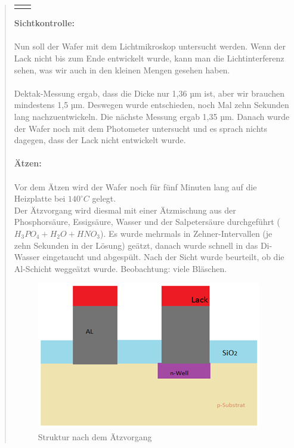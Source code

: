 \begin{quote}
\begin{center}
\begin{tabular}{ll}
\begin{minipage}{0.5\textwidth}
                    \end{minipage}

                \end{tabular}
			\end{center}

    		\vspace{2em}

    		\textbf{Sichtkontrolle:}\\
			\\
			Nun soll der Wafer mit dem Lichtmikroskop untersucht werden. Wenn
			der Lack nicht bis zum Ende entwickelt wurde, kann man die
			Lichtinterferenz sehen, was wir auch in den kleinen Mengen gesehen
			haben.\\
			\\
			Dektak-Messung ergab, dass die Dicke nur 1,36 µm ist, aber wir
			brauchen mindestens 1,5 µm. Deswegen wurde entschieden, noch Mal
			zehn Sekunden lang nachzuentwickeln. Die nächste Messung ergab
			1,35 µm. Danach wurde der Wafer noch mit dem Photometer untersucht
			und es sprach nichts dagegen, dass der Lack nicht entwickelt wurde.\\
			\\
			\textbf{Ätzen:}\\
			\\
			Vor dem Ätzen wird der Wafer noch für fünf Minuten lang auf die
			Heizplatte bei $140^{\circ}C$ gelegt.\\
			Der Ätzvorgang wird diesmal mit einer Ätzmischung aus der
			Phosphorsäure, Essigsäure, Wasser und der Salpetersäure durchgeführt
			($H_{3}PO_{4} +H_{2}O+HNO_{3}$). Es wurde mehrmals in
			Zehner-Intervallen (je zehn Sekunden in der Lösung) geätzt, danach
			wurde schnell in das Di-Wasser eingetaucht und abgespült. Nach der
			Sicht wurde beurteilt, ob die Al-Schicht weggeätzt wurde.
			Beobachtung: viele Bläschen.

			\vspace{2em}

    		\begin{figure}[H]
				\hspace{3 cm}
                  \includegraphics[scale=1, trim = 0cm 0cm 0cm 0cm,clip]
                	{./HerstellungBilder/StrukturnachdemAetzvorgang.png}
                  \caption{Struktur nach dem Ätzvorgang}
                \label{fig:Strukaetz}
            \end{figure}


\end{quote}
